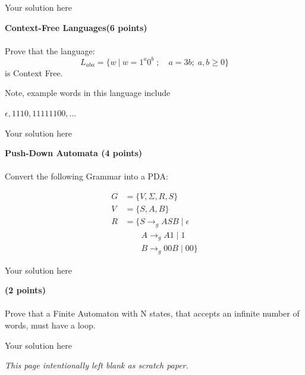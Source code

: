 \documentclass[12pt]{article}
\newenvironment{question}[2][Question]{\begin{trivlist}
\item[\hskip \labelsep {\bfseries #1}\hskip \labelsep {\bfseries #2.}]}{\end{trivlist}}
\newenvironment{solution}[1][Solution:]{\begin{trivlist}
\item[\hskip \labelsep {\bfseries #1}\hskip \labelsep {\bfseries}]\color{blue}}{\end{trivlist}}
\begin{document}
\begin{solution}
Your solution here
\end{solution}

\clearpage
\begin{question}{9}\textbf{Context-Free Languages(6 points)} \\\\

Prove that the language: \[L_{aba} = \{w \ | \ w = 1^a0^b \; ; \quad a = 3b ; \; a, b \geq 0 \} \] is Context Free.

Note, example words in this language include

$\epsilon, 1110, 11111100,...$
\end{question}


	\begin{solution}
 \;

 Your solution here
	\end{solution}

\clearpage
\begin{question}{10}\textbf{Push-Down Automata (4 points)} \\\\

Convert the following Grammar into a PDA:

\begin{align*}
    G &= \{V, \Sigma, R, S\}\\
    V &= \{S, A, B\}\\
    R &= \{ S \rightarrow_g ASB \;\vert\; \epsilon \\
      & \qquad A \rightarrow_g A1 \;\vert\; 1   \\
      & \qquad B \rightarrow_g 00B \;\vert\; 00\}
\end{align*}



\end{question}

\begin{solution}
\;
Your solution here
\end{solution}


\clearpage
\begin{question}{BONUS}\textbf{(2 points)} \\\\

Prove that a Finite Automaton with N states, that accepts an infinite number of words, must have a loop.

\end{question}

\begin{solution}
\;
Your solution here
\end{solution}


\clearpage
\begin{center}
\vspace{-3em}
\textit{This page intentionally left blank as scratch paper.}
\end{center}


\end{document}
